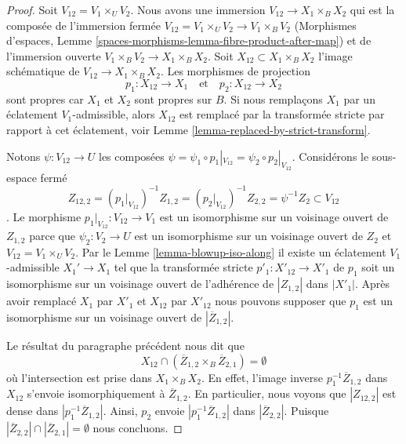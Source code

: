\begin{proof}
\medskip\noindent
Soit $V_{12} = V_1 \times_U V_2$. Nous avons une immersion
$V_{12} \to X_1 \times_B X_2$ qui est la composée de l'immersion fermée $V_{12} = V_1 \times_U V_2 \to V_1 \times_B V_2$
(Morphismes d'espaces, Lemme \ref{spaces-morphisms-lemma-fibre-product-after-map})
et de l'immersion ouverte $V_1 \times_B V_2 \to X_1 \times_B X_2$.
Soit $X_{12} \subset X_1 \times_B X_2$ l'image schématique de $V_{12} \to X_1 \times_B X_2$. Les morphismes de projection
$$
p_1 : X_{12} \to X_1
\quad\text{et}\quad
p_2 : X_{12} \to X_2
$$
sont propres car $X_1$ et $X_2$ sont propres sur $B$. Si nous remplaçons $X_1$ par un
éclatement $V_1$-admissible, alors $X_{12}$ est remplacé par
la transformée stricte par rapport à cet éclatement, voir
Lemme \ref{lemma-replaced-by-strict-transform}.

\medskip\noindent  
Notons $\psi : V_{12} \to U$ les composées  
$\psi = \psi_1 \circ p_1|_{V_{12}} = \psi_2 \circ p_2|_{V_{12}}$.  
Considérons le sous-espace fermé  
$$
Z_{12, 2} =
(p_1|_{V_{12}})^{-1}Z_{1, 2} =
(p_2|_{V_{12}})^{-1}Z_{2, 2} =
\psi^{-1}Z_2 \subset V_{12}
$$.  
Le morphisme $p_1|_{V_{12}} : V_{12} \to V_1$ est un isomorphisme  
sur un voisinage ouvert de $Z_{1, 2}$ parce que $\psi_2 : V_2 \to U$  
est un isomorphisme sur un voisinage ouvert de $Z_2$ et  
$V_{12} = V_1 \times_U V_2$. Par le Lemme \ref{lemma-blowup-iso-along}  
il existe un éclatement $V_1$-admissible $X_1' \to X_1$  
tel que la transformée stricte $p'_1 : X'_{12} \to X'_1$  
de $p_1$ soit un isomorphisme sur un voisinage ouvert de  
l'adhérence de $|Z_{1, 2}|$ dans $|X'_1|$.  
Après avoir remplacé $X_1$ par $X'_1$ et $X_{12}$ par $X'_{12}$  
nous pouvons supposer que $p_1$ est un isomorphisme sur un voisinage ouvert de $|\overline{Z}_{1, 2}|$.

\medskip\noindent
Le résultat du paragraphe précédent nous dit que
$$
X_{12} \cap (\overline{Z}_{1, 2} \times_B \overline{Z}_{2, 1}) = \emptyset
$$
où l'intersection est prise dans $X_1 \times_B X_2$. En effet, l'image inverse
$p_1^{-1}\overline{Z}_{1, 2}$ dans $X_{12}$ s'envoie isomorphiquement
à $\overline{Z}_{1, 2}$. En particulier, nous voyons que $|Z_{12, 2}|$
est dense dans $|p_1^{-1}\overline{Z}_{1, 2}|$. Ainsi, $p_2$ envoie
$|p_1^{-1}\overline{Z}_{1, 2}|$ dans $|\overline{Z}_{2, 2}|$.
Puisque $|\overline{Z}_{2, 2}| \cap |\overline{Z}_{2, 1}| = \emptyset$
nous concluons.


\end{proof}
